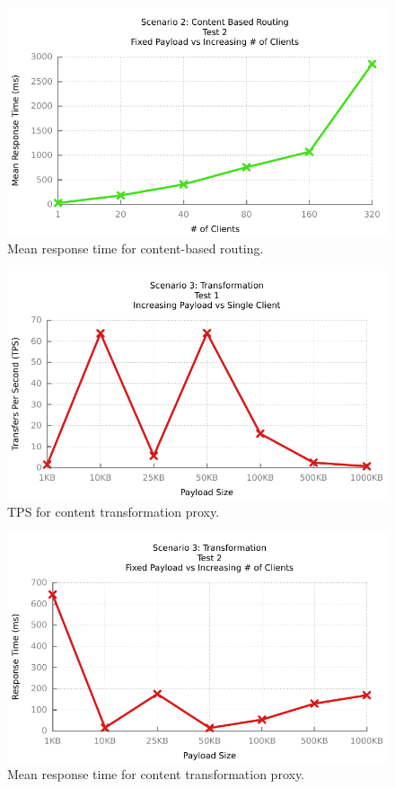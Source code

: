 \begin{figure}
	\centerline{\includegraphics{img/mediation_fp_iu_resp}}
	\caption{Mean response time for content-based routing.}
	\label{fig:mediation-2-2}
\end{figure}

\begin{figure}
	\centerline{\includegraphics{img/transform_fu_ip_tps}}
	\caption{TPS for content transformation proxy.}
	\label{fig:transform-1-1}
\end{figure}

\begin{figure}
	\centerline{\includegraphics{img/transform_fu_ip_resp}}
	\caption{Mean response time for content transformation proxy.}
	\label{fig:transform-1-2}
\end{figure}

